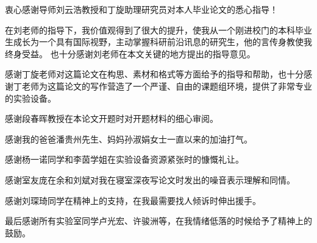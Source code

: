 
\begin{acknowledgements}
  衷心感谢导师刘云浩教授和丁旋助理研究员对本人毕业论文的悉心指导！
  
  在刘老师的指导下，我价值观得到了很大的提升，使我从一个刚进校门的本科毕业生成长为一个具有国际视野，主动掌握科研前沿讯息的研究生，他的言传身教使我终身受益。
  也十分感谢刘老师在本文关键的地方提出的指导意见。
  
  感谢丁旋老师对这篇论文在构思、素材和格式等方面给予的指导和帮助，也十分感谢丁老师为这篇论文的写作营造了一个严谨、自由的课题组环境，提供了非常专业的实验设备。

  感谢段春晖教授在本论文开题时对开题材料的细心审阅。
  
  感谢我的爸爸潘贵州先生、妈妈孙淑娟女士一直以来的加油打气。
  
  感谢杨一诺同学和李茵学姐在实验设备资源紧张时的慷慨礼让。
  
  感谢室友庞在余和刘斌对我在寝室深夜写论文时发出的噪音表示理解和同情。

  感谢刘琛琦同学在精神上的支持，在我最需要找人倾诉时伸出援手。

  最后感谢所有实验室同学卢光宏、许骏洲等，在我情绪低落的时候给予了精神上的鼓励。
\end{acknowledgements}
